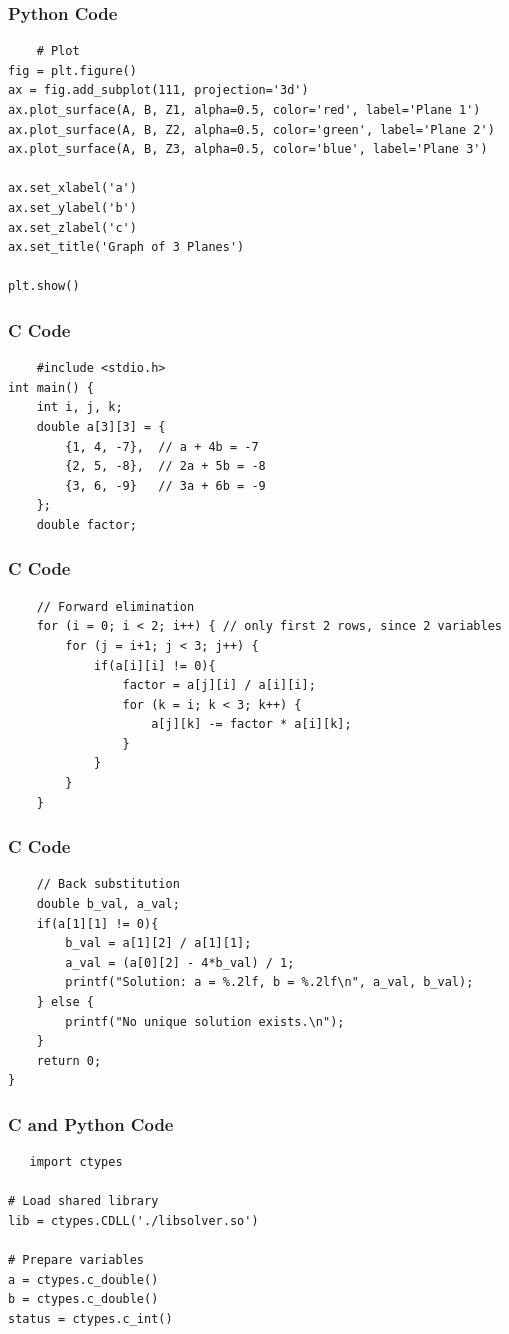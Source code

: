 \documentclass{beamer}
\begin{document}
\begin{frame}[fragile]
\frametitle{Python Code}
\begin{lstlisting}
    # Plot
fig = plt.figure()
ax = fig.add_subplot(111, projection='3d')
ax.plot_surface(A, B, Z1, alpha=0.5, color='red', label='Plane 1')
ax.plot_surface(A, B, Z2, alpha=0.5, color='green', label='Plane 2')
ax.plot_surface(A, B, Z3, alpha=0.5, color='blue', label='Plane 3')

ax.set_xlabel('a')
ax.set_ylabel('b')
ax.set_zlabel('c')
ax.set_title('Graph of 3 Planes')

plt.show()

\end{lstlisting}
\end{frame}
\begin{frame}[fragile]
\frametitle{C Code}
\begin{lstlisting}
    #include <stdio.h>
int main() {
    int i, j, k;
    double a[3][3] = {
        {1, 4, -7},  // a + 4b = -7
        {2, 5, -8},  // 2a + 5b = -8
        {3, 6, -9}   // 3a + 6b = -9
    };
    double factor;
\end{lstlisting}
\end{frame}
\begin{frame}[fragile]
\frametitle{C Code}
\begin{lstlisting}
    // Forward elimination
    for (i = 0; i < 2; i++) { // only first 2 rows, since 2 variables
        for (j = i+1; j < 3; j++) {
            if(a[i][i] != 0){
                factor = a[j][i] / a[i][i];
                for (k = i; k < 3; k++) {
                    a[j][k] -= factor * a[i][k];
                }
            }
        }
    }
\end{lstlisting}
\end{frame}
\begin{frame}[fragile]
\frametitle{C Code}
\begin{lstlisting}
    // Back substitution
    double b_val, a_val;
    if(a[1][1] != 0){
        b_val = a[1][2] / a[1][1];
        a_val = (a[0][2] - 4*b_val) / 1;
        printf("Solution: a = %.2lf, b = %.2lf\n", a_val, b_val);
    } else {
        printf("No unique solution exists.\n");
    }
    return 0;
}
\end{lstlisting}
\end{frame}
\begin{frame}[fragile]
\frametitle{C and Python Code}
\begin{lstlisting}
   import ctypes

# Load shared library
lib = ctypes.CDLL('./libsolver.so')

# Prepare variables
a = ctypes.c_double()
b = ctypes.c_double()
status = ctypes.c_int()
 
\end{lstlisting}
\end{frame}
\end{document}
